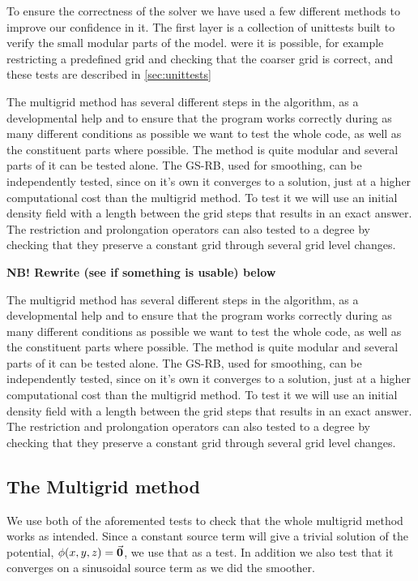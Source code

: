 
To ensure the correctness of the solver we have used a few different methods to
improve our confidence in it. The first layer is a collection of unittests built
to verify the small modular parts of the model. were it is possible, for example restricting
a predefined grid and checking that the coarser grid is correct, and these tests
are described in \cref{sec:unittests}


The multigrid method has several different steps in the algorithm, as a developmental
help and to ensure that the program works correctly during as many different conditions
as possible we want to test the whole code, as well as the constituent parts where possible.
The method is quite modular and several parts of it can be tested alone.
The GS-RB, used for smoothing, can be independently tested, since on it's own it converges to a solution,
just at a higher computational cost than the multigrid method. To test it we will
use an initial density field with a length between the grid steps that results in
an exact answer. The restriction and prolongation operators can also tested to a
degree by checking that they preserve a constant grid through several grid level changes.



\textbf{NB! Rewrite (see if something is usable) below}

The multigrid method has several different steps in the algorithm, as a developmental
help and to ensure that the program works correctly during as many different conditions
as possible we want to test the whole code, as well as the constituent parts where possible.
The method is quite modular and several parts of it can be tested alone.
The GS-RB, used for smoothing, can be independently tested, since on it's own it converges to a solution,
just at a higher computational cost than the multigrid method. To test it we will
use an initial density field with a length between the grid steps that results in
an exact answer. The restriction and prolongation operators can also tested to a
degree by checking that they preserve a constant grid through several grid level changes.

\subsection{The Multigrid method}
	We use both of the aforemented tests to check that the whole multigrid method
	works as intended. Since a constant source term will give a trivial solution of
	the potential, \(\phi(x,y,z) = \va{0}\), we use that as a test. In addition we
	also test that it converges on a sinusoidal source term as we did the smoother.

